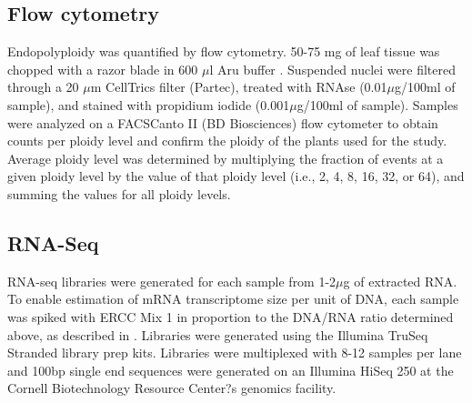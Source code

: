 \documentclass[11pt]{article}
\begin{document}
\subsection*{Flow cytometry}
Endopolyploidy was quantified by flow cytometry. 50-75 mg of leaf tissue was chopped with a razor blade in 600 $\mu$l Aru buffer \citep{arumuganathan1991}. Suspended nuclei were filtered through a 20 $\mu$m CellTrics filter (Partec), treated with RNAse (0.01$\mu$g/100ml of sample), and stained with propidium iodide (0.001$\mu$g/100ml of sample). Samples were analyzed on a FACSCanto II (BD Biosciences) flow cytometer to obtain counts per ploidy level and confirm the ploidy of the plants used for the study. Average ploidy level was determined by multiplying the fraction of events at a given ploidy level by the value of that ploidy level (i.e., 2, 4, 8, 16, 32, or 64), and summing the values for all ploidy levels.

\subsection*{RNA-Seq}
RNA-seq libraries were generated for each sample from 1-2$\mu$g of extracted RNA. To enable estimation of mRNA transcriptome size per unit of DNA, each sample was spiked with ERCC Mix 1 in proportion to the DNA/RNA ratio determined above, as described in \cite{robinson2018}. Libraries were generated using the Illumina TruSeq Stranded library prep kits. Libraries were multiplexed with 8-12 samples per lane and 100bp single end sequences were generated on an Illumina HiSeq 250 at the Cornell Biotechnology Resource Center?s genomics facility.
\end{document}
